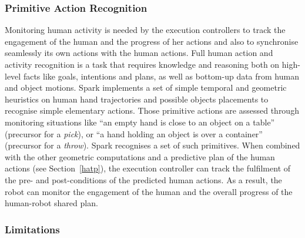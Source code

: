 \documentclass[preprint,3p,times]{elsarticle}
\begin{document}
%

\subsubsection{Primitive Action Recognition}

Monitoring human activity is needed by the execution controllers to track the
engagement of the human and the progress of her actions and also to synchronise seamlessly
its own actions with the human actions. Full human action
and activity recognition is a task that requires knowledge and reasoning both on
high-level facts like goals, intentions and plans, as well as bottom-up data
from human and object motions. {\sc Spark} implements a set of simple temporal and
geometric heuristics on human hand trajectories and possible objects placements
to recognise simple elementary actions. Those primitive actions are assessed through
monitoring situations like ``an empty hand is close to an object on a table''
(precursor for a \emph{pick}), or ``a hand holding an object is over a
container'' (precursor for a \emph{throw}).  {\sc Spark} recognises a set of
such primitives. When combined with the other geometric computations and a predictive
plan of the human actions (see Section~\ref{hatp}), the execution controller can
track the fulfilment of the pre- and post-conditions of the predicted human
actions. As a result, the robot can monitor the engagement of the human and the
overall progress of the human-robot shared plan.

\subsubsection{Limitations}
\end{document}
